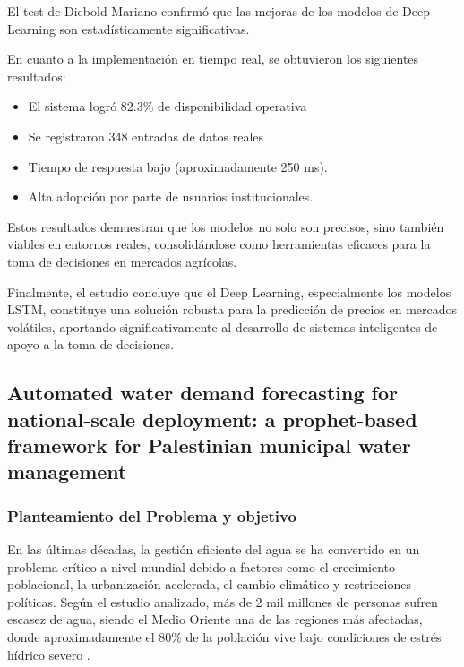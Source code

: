 El test de Diebold-Mariano confirmó que las mejoras de los modelos de Deep Learning son estadísticamente significativas.

En cuanto a la implementación en tiempo real, se obtuvieron los siguientes resultados:

	\begin{itemize}
		\item El sistema logró 82.3\% de disponibilidad operativa
		\item Se registraron 348 entradas de datos reales
		\item Tiempo de respuesta bajo (aproximadamente 250 ms).
		\item Alta adopción por parte de usuarios institucionales.
	\end{itemize}

Estos resultados demuestran que los modelos no solo son precisos, sino también viables en entornos reales, consolidándose como herramientas eficaces para la toma de decisiones en mercados agrícolas.

Finalmente, el estudio concluye que el Deep Learning, especialmente los modelos LSTM, constituye una solución robusta para la predicción de precios en mercados volátiles, aportando significativamente al desarrollo de sistemas inteligentes de apoyo a la toma de decisiones.



\subsection{Automated water demand forecasting for national-scale deployment: a prophet-based framework for Palestinian municipal water management \citep{salman2026water}}

\subsubsection{Planteamiento del Problema y objetivo}

En las últimas décadas, la gestión eficiente del agua se ha convertido en un problema crítico a nivel mundial debido a factores como el crecimiento poblacional, la urbanización acelerada, el cambio climático y restricciones políticas. Según el estudio analizado, más de 2 mil millones de personas sufren escasez de agua, siendo el Medio Oriente una de las regiones más afectadas, donde aproximadamente el 80\% de la población vive bajo condiciones de estrés hídrico severo \cite{ref_agua}.

